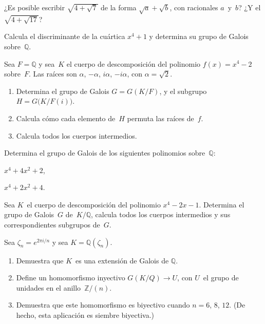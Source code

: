 \documentclass[12pt]{article}
\begin{document}
    
    \begin{exercise}[16.9.3]
        ¿Es posible escribir $\sqrt{4+\sqrt{7}}$ de la forma $\sqrt{a}+\sqrt{b}$, con racionales $a$~y~$b$? ¿Y el $\sqrt{4+\sqrt{17}}$?
    \end{exercise}
    
    
    \begin{exercise}[16.9.6]
        Calcula el discriminante de la cuártica $x^{4}+1$ y determina su grupo de Galois sobre~$\mathbb{Q}$.
    \end{exercise}
    
    \begin{exercise}[16.9.11]
        Sea $F=\mathbb{Q}$ y sea~$K$ el cuerpo de descomposición del polinomio $f(x)=x^{4}-2$ sobre~$F$. Las raíces son $\alpha$, $-\alpha$, $i \alpha$, $-i \alpha$, con $\alpha=\sqrt{2}$.
        \begin{enumerate}[\bfseries(a)]
            \item Determina el grupo de Galois $G=G(K/F)$, y el subgrupo $H=G\bigl(K/F(i)\bigr)$.
            \item Calcula cómo cada elemento de~$H$ permuta las raíces de~$f$.
            \item Calcula todos los cuerpos intermedios.
        \end{enumerate}
    \end{exercise}
    
    \begin{exercise}[16.9.12]
        Determina el grupo de Galois de los siguientes polinomios sobre~$\mathbb{Q}$:
        
        \noindent
        \begin{inparaenum}[\bfseries(a)]
            \item $x^{4}+4x^{2}+2$,
            \item $x^{4}+2x^{2}+4$.
        \end{inparaenum}
    \end{exercise}
    
    \begin{exercise}[16.9.13]
        Sea $K$~el cuerpo de descomposición del polinomio $x^{4}-2x-1$. Determina el grupo de Galois~$G$ de~$K/\mathbb{Q}$, calcula todos los cuerpos intermedios y sus correspondientes subgrupos de~$G$. 
    \end{exercise}
    
    
    \begin{exercise}[16.10.7]
        Sea $\zeta_{n}=e^{2\pi i/n}$ y sea $K=\mathbb{Q}(\zeta_{n})$.
        \begin{enumerate}[\bfseries(a)]
            \item Demuestra que $K$~es una extensión de Galois de $\mathbb{Q}$.
            \item Define un homomorfismo inyectivo $G(K/Q)\to U$, con $U$~el grupo de unidades en el anillo~$\mathbb{Z}/(n)$.
            \item Demuestra que este homomorfismo es biyectivo cuando $n=6$, $8$, $12$. (De hecho, esta aplicación es siembre biyectiva.)
        \end{enumerate}
    \end{exercise}
    
\end{document}
